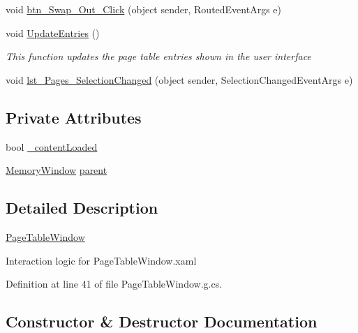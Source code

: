 \begin{DoxyCompactItemize}
void \hyperlink{class_c_p_u___o_s___simulator_1_1_page_table_window_a0a18aa563b2185c73dac319969a24c43}{btn\+\_\+\+Swap\+\_\+\+Out\+\_\+\+Click} (object sender, Routed\+Event\+Args e)
\item 
void \hyperlink{class_c_p_u___o_s___simulator_1_1_page_table_window_aea28126046f84b8a2cced2d22f21804d}{Update\+Entries} ()
\begin{DoxyCompactList}\small\item\em This function updates the page table entries shown in the user interface \end{DoxyCompactList}\item 
void \hyperlink{class_c_p_u___o_s___simulator_1_1_page_table_window_ab6e40cd99ff3eedb1719774c9a123650}{lst\+\_\+\+Pages\+\_\+\+Selection\+Changed} (object sender, Selection\+Changed\+Event\+Args e)
\end{DoxyCompactItemize}
\subsection*{Private Attributes}
\begin{DoxyCompactItemize}
\item 
bool \hyperlink{class_c_p_u___o_s___simulator_1_1_page_table_window_a9c12d3a4ba2ab4b676cb502ca8caa6fe}{\+\_\+content\+Loaded}
\item 
\hyperlink{class_c_p_u___o_s___simulator_1_1_memory_window}{Memory\+Window} \hyperlink{class_c_p_u___o_s___simulator_1_1_page_table_window_a1903e0b83820829549f74207cd209337}{parent}
\end{DoxyCompactItemize}


\subsection{Detailed Description}
\hyperlink{class_c_p_u___o_s___simulator_1_1_page_table_window}{Page\+Table\+Window} 

Interaction logic for Page\+Table\+Window.\+xaml 

Definition at line 41 of file Page\+Table\+Window.\+g.\+cs.



\subsection{Constructor \& Destructor Documentation}
\hypertarget{class_c_p_u___o_s___simulator_1_1_page_table_window_a9ddde0b8d78abd882007a4d919e5a082}{}

